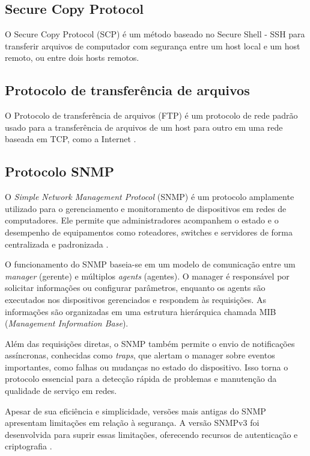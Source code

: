 \subsection{Secure Copy Protocol}
O Secure Copy Protocol (SCP) \cite{scp} é um método baseado no Secure Shell - SSH para transferir arquivos de computador com segurança entre um host local e um host remoto, ou entre dois hosts remotos.

\subsection{Protocolo de transferência de arquivos}

O Protocolo de transferência de arquivos (FTP) é um protocolo de rede padrão usado para a transferência de arquivos de um host para outro em uma rede baseada em TCP, como a Internet \cite{ftp}.

\subsection{Protocolo SNMP}

O \textit{Simple Network Management Protocol} (SNMP) é um protocolo amplamente utilizado para o gerenciamento e monitoramento de dispositivos em redes de computadores. Ele permite que administradores acompanhem o estado e o desempenho de equipamentos como roteadores, switches e servidores de forma centralizada e padronizada \cite{stallings_snmp}.

O funcionamento do SNMP baseia-se em um modelo de comunicação entre um \textit{manager} (gerente) e múltiplos \textit{agents} (agentes). O manager é responsável por solicitar informações ou configurar parâmetros, enquanto os agents são executados nos dispositivos gerenciados e respondem às requisições. As informações são organizadas em uma estrutura hierárquica chamada MIB (\textit{Management Information Base}).

Além das requisições diretas, o SNMP também permite o envio de notificações assíncronas, conhecidas como \textit{traps}, que alertam o manager sobre eventos importantes, como falhas ou mudanças no estado do dispositivo. Isso torna o protocolo essencial para a detecção rápida de problemas e manutenção da qualidade de serviço em redes.

Apesar de sua eficiência e simplicidade, versões mais antigas do SNMP apresentam limitações em relação à segurança. A versão SNMPv3 foi desenvolvida para suprir essas limitações, oferecendo recursos de autenticação e criptografia \cite{rfc3411}.


